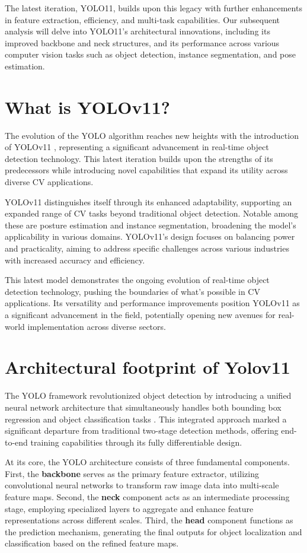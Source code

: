 \documentclass{article}
\begin{document}
The latest iteration, YOLO11, builds upon this legacy with further enhancements in feature extraction, efficiency, and multi-task capabilities. Our subsequent analysis will delve into YOLO11's architectural innovations, including its improved backbone and neck structures, and its performance across various computer vision tasks such as object detection, instance segmentation, and pose estimation.

\section{What is YOLOv11?}
The evolution of the YOLO algorithm reaches new heights with the introduction of YOLOv11 \cite{yolo11_ultralytics}, representing a significant advancement in real-time object detection technology. This latest iteration builds upon the strengths of its predecessors while introducing novel capabilities that expand its utility across diverse CV applications.

YOLOv11 distinguishes itself through its enhanced adaptability, supporting an expanded range of CV tasks beyond traditional object detection. Notable among these are posture estimation and instance segmentation, broadening the model's applicability in various domains. YOLOv11's design focuses on balancing power and practicality, aiming to address specific challenges across various industries with increased accuracy and efficiency.

This latest model demonstrates the ongoing evolution of real-time object detection technology, pushing the boundaries of what's possible in CV applications. Its versatility and performance improvements position YOLOv11 as a significant advancement in the field, potentially opening new avenues for real-world implementation across diverse sectors.

\section{Architectural footprint of Yolov11}

The YOLO framework revolutionized object detection by introducing a unified neural network architecture that simultaneously handles both bounding box regression and object classification tasks \cite{khanam2024comprehensive}. This integrated approach marked a significant departure from traditional two-stage detection methods, offering end-to-end training capabilities through its fully differentiable design.

At its core, the YOLO architecture consists of three fundamental components. First, the \textbf{backbone} serves as the primary feature extractor, utilizing convolutional neural networks to transform raw image data into multi-scale feature maps. Second, the \textbf{neck} component acts as an intermediate processing stage, employing specialized layers to aggregate and enhance feature representations across different scales. Third, the \textbf{head} component functions as the prediction mechanism, generating the final outputs for object localization and classification based on the refined feature maps.
\end{document}
